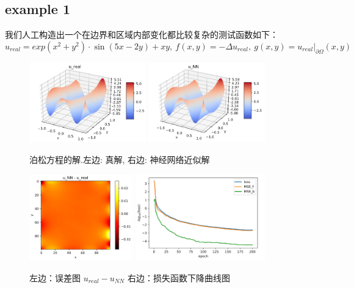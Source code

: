 \documentclass{article}
\begin{document}
\subsection{example 1}
我们人工构造出一个在边界和区域内部变化都比较复杂的测试函数如下：
$$
u_{real} = exp(x^2 + y^2)\cdot \sin(5x-2y) + xy,\ f(x,y) = -\Delta u_{real}, \ g(x,y)=u_{real}|_{\partial \Omega}(x,y)
$$
\begin{figure}[ht]
 	 \centering
 	 \includegraphics[width=0.45\textwidth]{images/poisson_real.png}
 	 \includegraphics[width=0.45\textwidth]{images/poisson_NN.png}
	 \caption {泊松方程的解.左边: 真解, 右边: 神经网络近似解}
	 \label{解景观}
\end{figure}

\begin{figure}[ht]
 	 \centering
 	 \includegraphics[width=0.4\textwidth]{images/poisson_error.png}
 	 \includegraphics[width=0.5\textwidth]{images/poisson_loss.png}
	 \caption {左边：误差图 $u_{real} - u_{NN}$ 右边：损失函数下降曲线图}
	 \label{误差图和Loss图}
\end{figure}
\end{document}
